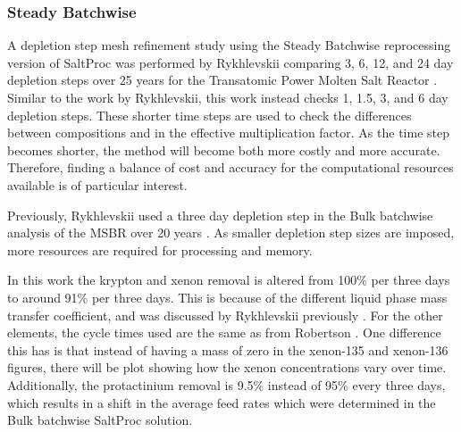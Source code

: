 \subsubsection{Steady Batchwise}
\label{s:steady-batch-mesh}

A depletion step mesh refinement study using the Steady Batchwise reprocessing version of SaltProc was performed by Rykhlevskii comparing 3, 6, 12, and 24 day depletion steps over 25 years for the Transatomic Power Molten Salt Reactor \cite{rykhlevskii_fuel_2020}.
Similar to the work by Rykhlevskii, this work instead checks 1, 1.5, 3, and 6 day depletion steps.
These shorter time steps are used to check the differences between compositions and in the effective multiplication factor.
As the time step becomes shorter, the method will become both more costly and more accurate.
Therefore, finding a balance of cost and accuracy for the computational resources available is of particular interest.


Previously, Rykhlevskii used a three day depletion step in the Bulk batchwise analysis of the MSBR over 20 years \cite{rykhlevskii_advanced_2018}.
As smaller depletion step sizes are imposed, more resources are required for processing and memory.

In this work the krypton and xenon removal is altered from 100\% per three days to around 91\% per three days.
This is because of the different liquid phase mass transfer coefficient, and was discussed by Rykhlevskii previously \cite{rykhlevskii_fuel_2020}.
For the other elements, the cycle times used are the same as from Robertson \cite{robertson_conceptual_1971}.
One difference this has is that instead of having a mass of zero in the xenon-135 and xenon-136 figures, there will be plot showing how the xenon concentrations vary over time.
Additionally, the protactinium removal is 9.5\% instead of 95\% every three days, which results in a shift in the average feed rates which were determined in the Bulk batchwise SaltProc solution.


